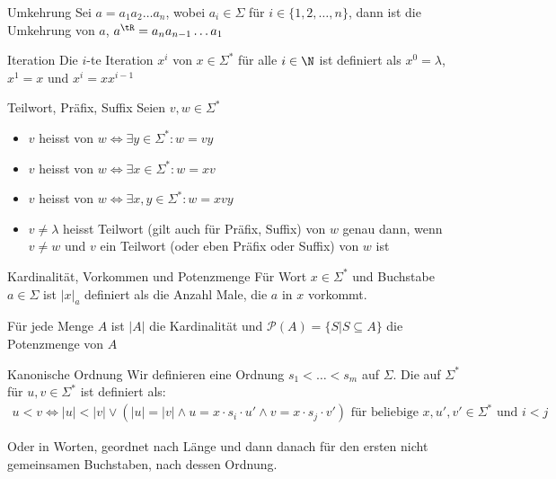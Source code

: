 \begin{definition}[]{Umkehrung}
    Sei $a = a_1 a_2 \ldots a_n$, wobei $a_i \in \Sigma$ für $i \in \{1, 2, \ldots, n\}$, dann ist die Umkehrung von $a$, $a^\tR = a_n a_{n - 1} \ldots a_1$
\end{definition}


\begin{definition}[]{Iteration}
    Die $i$-te Iteration $x^i$ von $x \in \Sigma^*$ für alle $i \in \N$ ist definiert als $x^0 = \lambda$, $x^1 = x$ und $x^i = xx^{i - 1}$
\end{definition}


\begin{definition}[]{Teilwort, Präfix, Suffix}
    Seien $v, w \in \Sigma^*$
    \begin{itemize}
        \item $v$ heisst  von $w \Longleftrightarrow \exists y \in \Sigma^* : w = vy$
        \item $v$ heisst  von $w \Longleftrightarrow \exists x \in \Sigma^* : w = xv$
        \item $v$ heisst  von $w \Longleftrightarrow \exists x, y \in \Sigma^* : w = xvy$
        \item $v \neq \lambda$ heisst  Teilwort (gilt auch für Präfix, Suffix) von $w$ genau dann, wenn $v \neq w$ und $v$ ein Teilwort (oder eben Präfix oder Suffix) von $w$ ist
    \end{itemize}
\end{definition}

\begin{definition}[]{Kardinalität, Vorkommen und Potenzmenge}
    Für Wort $x \in \Sigma^*$ und Buchstabe $a \in \Sigma$ ist $|x|_a$ definiert als die Anzahl Male, die $a$ in $x$ vorkommt.

    Für jede Menge $A$ ist $|A|$ die Kardinalität und $\mathcal{P}(A) = \{S | S \subseteq A\}$ die Potenzmenge von $A$
\end{definition}


\begin{definition}[]{Kanonische Ordnung}
    Wir definieren eine Ordnung $s_1 < \ldots < s_m$ auf $\Sigma$. Die  auf $\Sigma^*$ für $u, v \in \Sigma^*$ ist definiert als:
    \begin{align*}
        u < v \Longleftrightarrow |u| < |v| \lor (|u| = |v| \land u = x \cdot s_i \cdot u' \land v = x \cdot s_j \cdot v') \text{ für beliebige $x, u', v' \in \Sigma^*$ und $i < j$}
    \end{align*}

    Oder in Worten, geordnet nach Länge und dann danach für den ersten nicht gemeinsamen Buchstaben, nach dessen Ordnung.
\end{definition}


